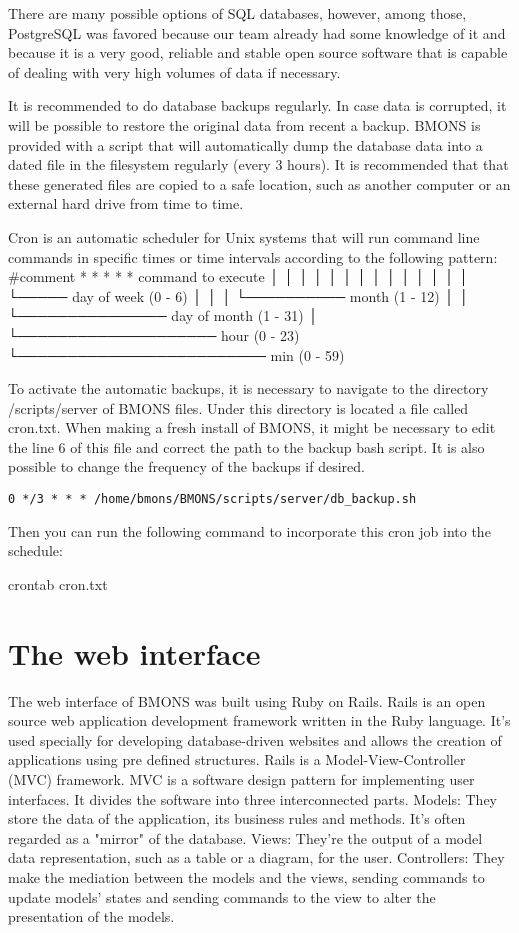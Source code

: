 There are many possible options of SQL databases, however, among those, PostgreSQL was favored because our team already had some knowledge of it and because it is a very good, reliable and stable open source software that is capable of dealing with very high volumes of data if necessary.

It is recommended to do database backups regularly. In case data is corrupted, it will be possible to restore the original data from recent a backup. BMONS is provided with a script that will automatically dump the database data into a dated file in the filesystem regularly (every 3 hours). It is recommended that that these generated files are copied to a safe location, such as another computer or an external hard drive from time to time.

Cron is an automatic scheduler for Unix systems that will run command line commands in specific times or time intervals according to the following pattern:
  #comment
  * * * * *  command to execute
  │ │ │ │ │
  │ │ │ │ │
  │ │ │ │ └───── day of week (0 - 6)
  │ │ │ └────────── month (1 - 12)
  │ │ └─────────────── day of month (1 - 31)
  │ └──────────────────── hour (0 - 23)
  └───────────────────────── min (0 - 59)

To activate the automatic backups, it is necessary to navigate to the directory /scripts/server of BMONS files. Under this directory is located a file called cron.txt. When making a fresh install of BMONS, it might be necessary to edit the line 6 of this file and correct the path to the backup bash script. It is also possible to change the frequency of the backups if desired. 
 
\texttt{0 */3 * * * /home/bmons/BMONS/scripts/server/db\_backup.sh}

Then you can run the following command to incorporate this cron job into the schedule:

\indent crontab cron.txt

\clearpage
\section{The web interface}

The web interface of BMONS was built using Ruby on Rails. Rails is an open source web application development framework written in the Ruby language. It's used specially for developing database-driven websites and allows the creation of applications using pre defined structures. Rails is a Model-View-Controller (MVC) framework. MVC is a software design pattern for implementing user interfaces. It divides the software into three interconnected parts. 
Models: They store the data of the application, its business rules and methods. It's often regarded as a "mirror" of the database.
Views: They're the output of a model data representation, such as a table or a diagram, for the user.
Controllers: They make the mediation between the models and the views, sending commands to update models' states and sending commands to the view to alter the presentation of the models.

